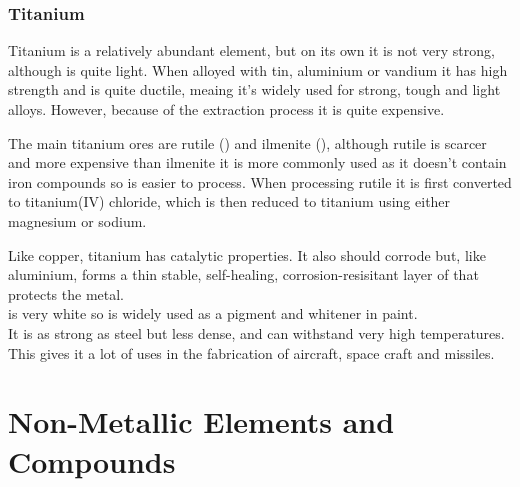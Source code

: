 \documentclass[a4paper, 12pt]{article}
\begin{document}
			\subsubsection*{Titanium}
				Titanium is a relatively abundant element, but on its own it is not very strong, although is quite light. When alloyed with tin, aluminium or vandium it has high strength and is quite ductile, meaing it's widely used for strong, tough and light alloys. However, because of the extraction process it is quite expensive. \\
				\par
				The main titanium ores are rutile () and ilmenite (), although rutile is scarcer and more expensive than ilmenite it is more commonly used as it doesn't contain iron compounds so is easier to process. When processing rutile it is first converted to titanium(IV) chloride, which is then reduced to titanium using either magnesium or sodium. \\
				\par
				Like copper, titanium has catalytic properties. It also should corrode but, like aluminium, forms a thin stable, self-healing, corrosion-resisitant layer of  that protects the metal. \\
				 is very white so is widely used as a pigment and whitener in paint. \\
				It is as strong as steel but less dense, and can withstand very high temperatures. This gives it a lot of uses in the fabrication of aircraft, space craft and missiles.
				
\newpage

\section{Non-Metallic Elements and Compounds}
\end{document}

